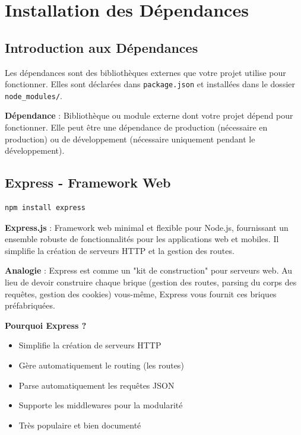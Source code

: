 \chapter{Installation des Dépendances}

\section{Introduction aux Dépendances}

Les dépendances sont des bibliothèques externes que votre projet utilise pour fonctionner. Elles sont déclarées dans \texttt{package.json} et installées dans le dossier \texttt{node\_modules/}.

\begin{definitionbox}
    \textbf{Dépendance} : Bibliothèque ou module externe dont votre projet dépend pour fonctionner. Elle peut être une dépendance de production (nécessaire en production) ou de développement (nécessaire uniquement pendant le développement).
\end{definitionbox}

\section{Express - Framework Web}

\begin{lstlisting}[style=bash, caption=Installation d'Express]
npm install express
\end{lstlisting}

\begin{definitionbox}
    \textbf{Express.js} : Framework web minimal et flexible pour Node.js, fournissant un ensemble robuste de fonctionnalités pour les applications web et mobiles. Il simplifie la création de serveurs HTTP et la gestion des routes.
\end{definitionbox}

\begin{analogybox}
    \textbf{Analogie} : Express est comme un "kit de construction" pour serveurs web. Au lieu de devoir construire chaque brique (gestion des routes, parsing du corps des requêtes, gestion des cookies) vous-même, Express vous fournit ces briques préfabriquées.
\end{analogybox}

\textbf{Pourquoi Express ?}
\begin{itemize}
    \item Simplifie la création de serveurs HTTP
    \item Gère automatiquement le routing (les routes)
    \item Parse automatiquement les requêtes JSON
    \item Supporte les middlewares pour la modularité
    \item Très populaire et bien documenté
\end{itemize}

